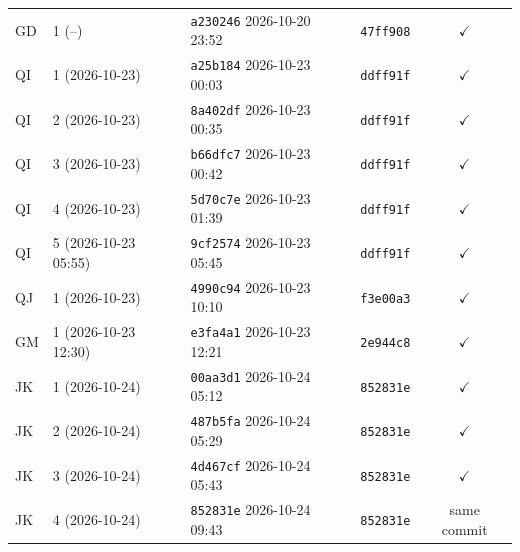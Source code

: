 \begin{tabular}{llllc}
GD & 1 (--) & \texttt{a230246} 2026-10-20 23:52 & \texttt{47ff908} & $\checkmark$ \\
QI & 1 (2026-10-23) & \texttt{a25b184} 2026-10-23 00:03 & \texttt{ddff91f} & $\checkmark$ \\
QI & 2 (2026-10-23) & \texttt{8a402df} 2026-10-23 00:35 & \texttt{ddff91f} & $\checkmark$ \\
QI & 3 (2026-10-23) & \texttt{b66dfc7} 2026-10-23 00:42 & \texttt{ddff91f} & $\checkmark$ \\
QI & 4 (2026-10-23) & \texttt{5d70c7e} 2026-10-23 01:39 & \texttt{ddff91f} & $\checkmark$ \\
QI & 5 (2026-10-23 05:55) & \texttt{9cf2574} 2026-10-23 05:45 & \texttt{ddff91f} & $\checkmark$ \\
QJ & 1 (2026-10-23) & \texttt{4990c94} 2026-10-23 10:10 & \texttt{f3e00a3} & $\checkmark$ \\
GM & 1 (2026-10-23 12:30) & \texttt{e3fa4a1} 2026-10-23 12:21 & \texttt{2e944c8} & $\checkmark$ \\
JK & 1 (2026-10-24) & \texttt{00aa3d1} 2026-10-24 05:12 & \texttt{852831e} & $\checkmark$ \\
JK & 2 (2026-10-24) & \texttt{487b5fa} 2026-10-24 05:29 & \texttt{852831e} & $\checkmark$ \\
JK & 3 (2026-10-24) & \texttt{4d467cf} 2026-10-24 05:43 & \texttt{852831e} & $\checkmark$ \\
JK & 4 (2026-10-24) & \texttt{852831e} 2026-10-24 09:43 & \texttt{852831e} & same commit \\
\bottomrule
\end{tabular}
